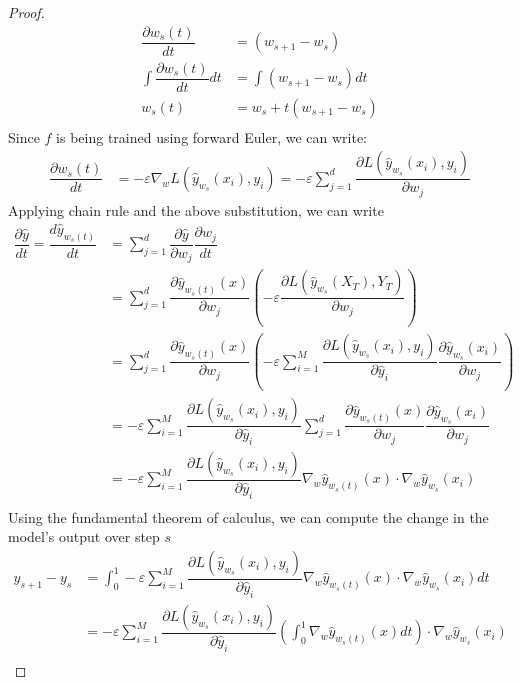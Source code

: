 \begin{proof}
\begin{align}
    \dfrac{\partial w_s(t)}{dt} &= (w_{s+1} - w_s)\\   
    \int \dfrac{\partial w_s(t)}{dt} dt &= \int (w_{s+1} - w_s)dt\\
    w_s(t) &= w_s + t(w_{s+1} - w_s)\\
\end{align}
Since $f$ is being trained using forward Euler, we can write:
\begin{align}
    \dfrac{\partial w_s(t)}{dt} &= -\varepsilon \nabla_w L(\hat y_{w_s}(x_i), y_i) = -\varepsilon \sum_{j = 1}^{d} \dfrac{\partial L(\hat y_{w_s}(x_i),  y_i)}{\partial w_j} \label{eq10}
\end{align}
Applying chain rule and the above substitution, we can write
\begin{align}
    \dfrac{\partial \hat y}{dt} = \dfrac{d \hat y_{w_s(t)}}{dt} &= \sum_{j = 1}^{d} \dfrac{\partial \hat y}{\partial w_j} \dfrac{\partial w_j}{dt}\\
&= \sum_{j = 1}^{d} \dfrac{\partial \hat y_{w_s(t)}(x)}{\partial w_j} \left(-\varepsilon \dfrac{\partial L(\hat y_{w_s}(X_T),  Y_T)}{\partial w_j}\right)\\
&= \sum_{j = 1}^{d} \dfrac{\partial \hat y_{w_s(t)}(x)}{\partial w_j} \left(-\varepsilon \sum_{i = 1}^{M}\dfrac{\partial L(\hat y_{w_s}(x_i),  y_i)}{\partial \hat y_i}\dfrac{\partial \hat y_{w_s}(x_i)}{\partial w_j}\right)\\
&= -\varepsilon \sum_{i = 1}^{M} \dfrac{\partial L(\hat y_{w_s}(x_i),  y_i)}{\partial \hat y_i} \sum_{j = 1}^{d} \dfrac{\partial \hat y_{w_s(t)}(x)}{\partial w_j}  \dfrac{\partial \hat y_{w_s}(x_i)}{\partial w_j}\\
&= -\varepsilon \sum_{i = 1}^{M} \dfrac{\partial L(\hat y_{w_s}(x_i),  y_i)}{\partial \hat y_i}  \nabla_w \hat y_{w_s(t)}(x) \cdot \nabla_w \hat y_{w_s}(x_i)\\
\end{align}
Using the fundamental theorem of calculus, we can compute the change in the model's output over step $s$
\begin{align}
    y_{s+1} - y_s &= \int_0^1 -\varepsilon \sum_{i = 1}^{M} \dfrac{\partial L(\hat y_{w_s}(x_i),  y_i)}{\partial \hat y_i}  \nabla_w \hat y_{w_s(t)}(x) \cdot \nabla_w \hat y_{w_s}(x_i)dt\\
 &=  -\varepsilon \sum_{i = 1}^{M} \dfrac{\partial L(\hat y_{w_s}(x_i),  y_i)}{\partial \hat y_i}  \left(\int_0^1\nabla_w \hat y_{w_s(t)}(x)dt\right) \cdot \nabla_w \hat y_{w_s}(x_i)\\

\end{align}
\end{proof}
